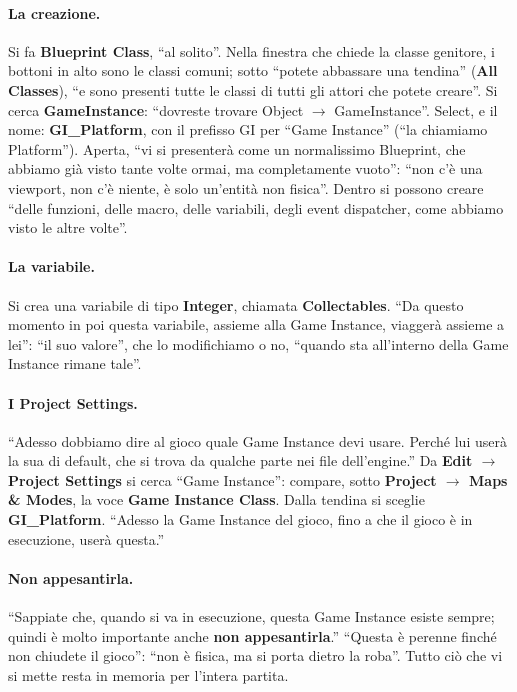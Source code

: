 \paragraph{La creazione.} Si fa \textbf{Blueprint Class}, ``al solito''. Nella finestra
che chiede la classe genitore, i bottoni in alto sono le classi comuni; sotto ``potete
abbassare una tendina'' (\textbf{All Classes}), ``e sono presenti tutte le classi di tutti
gli attori che potete creare''. Si cerca \textbf{GameInstance}: ``dovreste trovare Object
$\rightarrow$ GameInstance''. Select, e il nome: \textbf{GI\_Platform}, con il prefisso
GI per ``Game Instance'' (``la chiamiamo Platform''). Aperta, ``vi si presenterà come un
normalissimo Blueprint, che abbiamo già visto tante volte ormai, ma completamente
vuoto'': ``non c'è una viewport, non c'è niente, è solo un'entità non fisica''. Dentro si
possono creare ``delle funzioni, delle macro, delle variabili, degli event dispatcher,
come abbiamo visto le altre volte''.

\paragraph{La variabile.} Si crea una variabile di tipo \textbf{Integer}, chiamata
\textbf{Collectables}. ``Da questo momento in poi questa variabile, assieme alla Game
Instance, viaggerà assieme a lei'': ``il suo valore'', che lo modifichiamo o no,
``quando sta all'interno della Game Instance rimane tale''.

\paragraph{I Project Settings.} ``Adesso dobbiamo dire al gioco quale Game Instance devi
usare. Perché lui userà la sua di default, che si trova da qualche parte nei file
dell'engine.'' Da \textbf{Edit $\rightarrow$ Project Settings} si cerca ``Game Instance'':
compare, sotto \textbf{Project $\rightarrow$ Maps \& Modes}, la voce \textbf{Game Instance
Class}. Dalla tendina si sceglie \textbf{GI\_Platform}. ``Adesso la Game Instance del
gioco, fino a che il gioco è in esecuzione, userà questa.''

\paragraph{Non appesantirla.} ``Sappiate che, quando si va in esecuzione, questa Game
Instance esiste sempre; quindi è molto importante anche \textbf{non appesantirla}.''
``Questa è perenne finché non chiudete il gioco'': ``non è fisica, ma si porta dietro la
roba''. Tutto ciò che vi si mette resta in memoria per l'intera partita.

